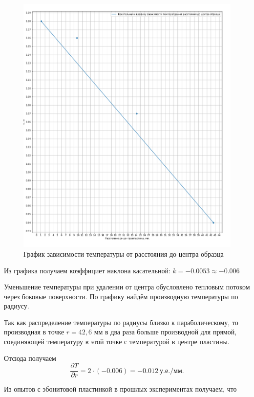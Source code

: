 \documentclass[a4paper, 12pt]{article}
\begin{document}
\begin{figure}[h]
	\begin{center}
		\includegraphics[width=18cm]{u_to_r.png}
		\caption{График зависимости температуры от расстояния до центра образца}\label{img:gr2}
	\end{center}
\end{figure}

Из графика получаем коэффициет наклона касательной: $k = -0.0053 \approx -0.006$

Уменьшение температуры при удалении от центра обусловлено тепловым потоком через боковые поверхности. По графику найдём производную температуры по радиусу.

Так как распределение температуры по радиусы близко к параболическому, то производная в точке $ r = 42,6 $ мм в два раза больше производной для прямой, соединяющей температуру в этой точке с температурой в центре пластины.

Отсюда получаем \[ \frac{\partial T}{\partial r} = 2 \cdot (-0.006) = -0.012~у.е./мм. \]

Из опытов с эбонитовой пластинкой в прошлых экспериментах получаем, что
\end{document}
